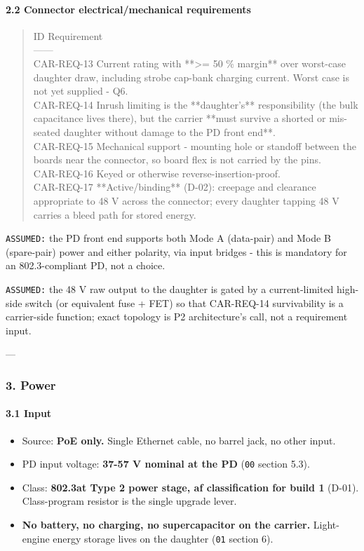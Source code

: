 \documentclass[11pt,a4paper]{article}
\begin{document}
\paragraph*{2.2 Connector electrical/mechanical requirements}
\begin{quote}\small\ttfamily\raggedright
\textbar{} ID \textbar{} Requirement \textbar{}\\
\textbar{}---\textbar{}---\textbar{}\\
\textbar{} CAR-REQ-13 \textbar{} Current rating with {*}{*}\textgreater{}= 50 \% margin{*}{*} over worst-case daughter draw, including strobe cap-bank charging current. Worst case is not yet supplied - Q6. \textbar{}\\
\textbar{} CAR-REQ-14 \textbar{} Inrush limiting is the {*}{*}daughter's{*}{*} responsibility (the bulk capacitance lives there), but the carrier {*}{*}must survive a shorted or mis-seated daughter without damage to the PD front end{*}{*}. \textbar{}\\
\textbar{} CAR-REQ-15 \textbar{} Mechanical support - mounting hole or standoff between the boards near the connector, so board flex is not carried by the pins. \textbar{}\\
\textbar{} CAR-REQ-16 \textbar{} Keyed or otherwise reverse-insertion-proof. \textbar{}\\
\textbar{} CAR-REQ-17 \textbar{} {*}{*}Active/binding{*}{*} (D-02): creepage and clearance appropriate to 48 V across the connector; every daughter tapping 48 V carries a bleed path for stored energy. \textbar{}
\end{quote}
\texttt{ASSUMED:} the PD front end supports both Mode A (data-pair) and Mode B (spare-pair) power and either polarity, via input bridges - this is mandatory for an 802.3-compliant PD, not a choice.

\texttt{ASSUMED:} the 48 V raw output to the daughter is gated by a current-limited high-side switch (or equivalent fuse + FET) so that CAR-REQ-14 survivability is a carrier-side function; exact topology is P2 architecture's call, not a requirement input.

---

\subsubsection*{3. Power}
\paragraph*{3.1 Input}
\begin{itemize}
\item Source: \textbf{PoE only.} Single Ethernet cable, no barrel jack, no other input.
\item PD input voltage: \textbf{37-57 V nominal at the PD} (\texttt{00} section 5.3).
\item Class: \textbf{802.3at Type 2 power stage, af classification for build 1} (D-01). Class-program
resistor is the single upgrade lever.
\item \textbf{No battery, no charging, no supercapacitor on the carrier.} Light-engine energy storage
lives on the daughter (\texttt{01} section 6).
\end{itemize}
\end{document}
